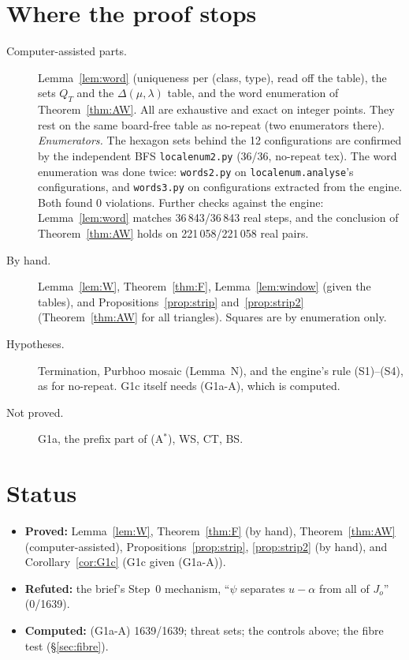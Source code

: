 \documentclass[11pt]{article}
\theoremstyle{definition}\newtheorem{definition}[theorem]{Definition}\newtheorem{remark}[theorem]{Remark}
\begin{document}
\section{Where the proof stops}\label{sec:gaps}
\begin{description}
\item[Computer-assisted parts.] Lemma~\ref{lem:word} (uniqueness per (class, type), read off the table), the sets $Q_T$ and the $\Delta(\mu,\lambda)$ table, and the word enumeration of Theorem~\ref{thm:AW}. All are exhaustive and exact on integer points. They rest on the same board-free table as no-repeat (two enumerators there).
\emph{Enumerators.} The hexagon sets behind the 12 configurations are confirmed by the independent BFS \texttt{localenum2.py} (36/36, no-repeat tex). The word enumeration was done twice: \texttt{words2.py} on \texttt{localenum.analyse}'s configurations, and \texttt{words3.py} on configurations extracted from the engine. Both found 0 violations. Further checks against the engine: Lemma~\ref{lem:word} matches 36\,843/36\,843 real steps, and the conclusion of Theorem~\ref{thm:AW} holds on 221\,058/221\,058 real pairs.
\item[By hand.] Lemma~\ref{lem:W}, Theorem~\ref{thm:F}, Lemma~\ref{lem:window} (given the tables), and Propositions~\ref{prop:strip} and~\ref{prop:strip2} (Theorem~\ref{thm:AW} for all triangles). Squares are by enumeration only.
\item[Hypotheses.] Termination, Purbhoo mosaic (Lemma~N), and the engine's rule (S1)--(S4), as for no-repeat. G1c itself needs (G1a-A), which is computed.
\item[Not proved.] G1a, the prefix part of (A$^*$), WS, CT, BS.
\end{description}

\section*{Status}
\begin{itemize}
\item \textbf{Proved:} Lemma~\ref{lem:W}, Theorem~\ref{thm:F} (by hand), Theorem~\ref{thm:AW} (computer-assisted), Propositions~\ref{prop:strip}, \ref{prop:strip2} (by hand), and Corollary~\ref{cor:G1c} (G1c given (G1a-A)).
\item \textbf{Refuted:} the brief's Step~0 mechanism, ``$\psi$ separates $u-\alpha$ from all of $J_o$'' (0/1639).
\item \textbf{Computed:} (G1a-A) 1639/1639; threat sets; the controls above; the fibre test (\S\ref{sec:fibre}).
\end{itemize}
\end{document}
